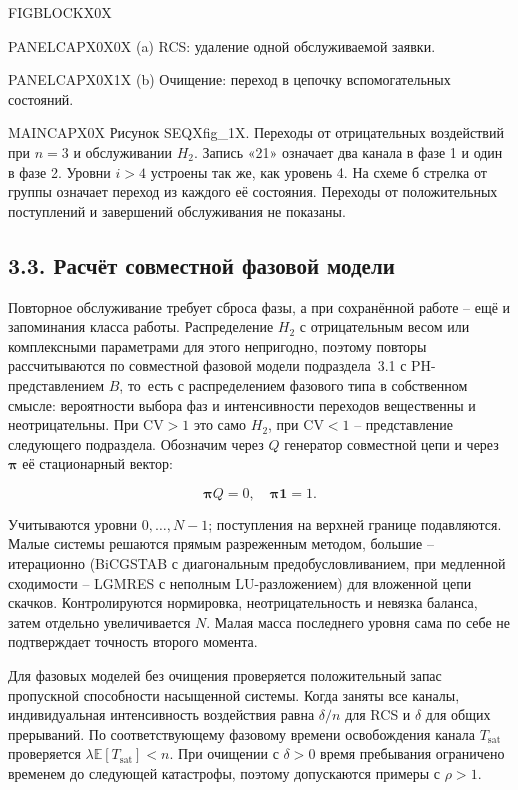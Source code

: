 \noindent FIGBLOCKX0X\par

\noindent PANELCAPX0X0X (a) RCS: удаление одной обслуживаемой заявки.\par

\noindent PANELCAPX0X1X (b) Очищение: переход в цепочку вспомогательных состояний.\par

\noindent MAINCAPX0X Рисунок SEQXfig_1X. Переходы от отрицательных воздействий при \(n=3\) и обслуживании \(H_2\). Запись «21» означает два канала в фазе 1 и один в фазе 2. Уровни \(i>4\) устроены так же, как уровень 4. На схеме б стрелка от группы означает переход из каждого её состояния. Переходы от положительных поступлений и завершений обслуживания не показаны.\par

\subsection*{3.3. Расчёт совместной фазовой модели}
Повторное обслуживание требует сброса фазы, а при сохранённой работе -- ещё и запоминания класса работы. Распределение \(H_2\) с отрицательным весом или комплексными параметрами для этого непригодно, поэтому повторы рассчитываются по совместной фазовой модели подраздела~3.1 с PH-представлением \(B\), то~есть с распределением фазового типа в собственном смысле: вероятности выбора фаз и интенсивности переходов вещественны и неотрицательны. При \(\mathrm{CV}>1\) это само \(H_2\), при \(\mathrm{CV}<1\) -- представление следующего подраздела. Обозначим через \(Q\) генератор совместной цепи и через \(\boldsymbol\pi\) её стационарный вектор:


\[\boldsymbol\pi Q=0,\quad \boldsymbol\pi\mathbf1=1.\]


Учитываются уровни \(0,\ldots,N-1\); поступления на верхней границе подавляются. Малые системы решаются прямым разреженным методом, большие -- итерационно (BiCGSTAB с диагональным предобусловливанием, при медленной сходимости -- LGMRES с неполным LU-разложением) для вложенной цепи скачков. Контролируются нормировка, неотрицательность и невязка баланса, затем отдельно увеличивается \(N\). Малая масса последнего уровня сама по себе не подтверждает точность второго момента.

Для фазовых моделей без очищения проверяется положительный запас пропускной способности насыщенной системы. Когда заняты все каналы, индивидуальная интенсивность воздействия равна \(\delta/n\) для RCS и \(\delta\) для общих прерываний. По соответствующему фазовому времени освобождения канала \(T_{\mathrm{sat}}\) проверяется \(\lambda\mathbb E[T_{\mathrm{sat}}]<n\). При очищении с \(\delta>0\) время пребывания ограничено временем до следующей катастрофы, поэтому допускаются примеры с \(\rho>1\).

